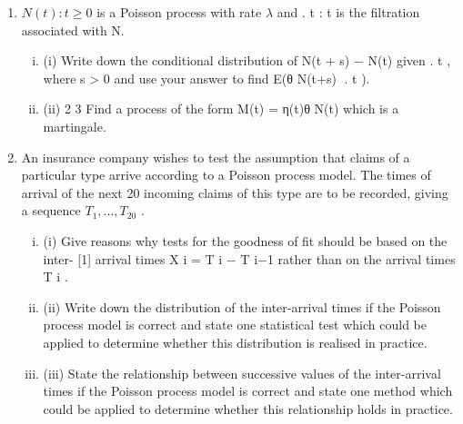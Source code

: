\documentclass[a4paper,12pt]{article}
\begin{document}
\begin{enumerate}
\item ${N(t) : t \geq 0}$ is a Poisson process with rate $\lambda$ and {. t : t } is the filtration
associated with N.
\begin{enumerate}[(i)]
\item(i)
Write down the conditional distribution of N(t + s) − N(t) given . t , where
s > 0 and use your answer to find E(θ N(t+s) . t ).
\item (ii)
2
3
Find a process of the form M(t) = η(t)θ N(t) which is a martingale.
\end{enumerate}

\item An insurance company wishes to test the assumption that claims of a particular
type arrive according to a Poisson process model. The times of arrival of the next
20 incoming claims of this type are to be recorded, giving a sequence $T_1 , ..., T_{20}$ .
\begin{enumerate}[(i)]
\item (i) Give reasons why tests for the goodness of fit should be based on the inter-
[1]
arrival times X i = T i − T i−1 rather than on the arrival times T i .
\item (ii) Write down the distribution of the inter-arrival times if the Poisson process model is correct and state one statistical test which could be
applied to determine whether this distribution is realised in practice.
\item 
(iii) State the relationship between successive values of the inter-arrival times if the Poisson process model is correct and state one method which could
be applied to determine whether this relationship holds in practice.
\end{enumerate}

\newpage


\end{enumerate}
\end{document}
